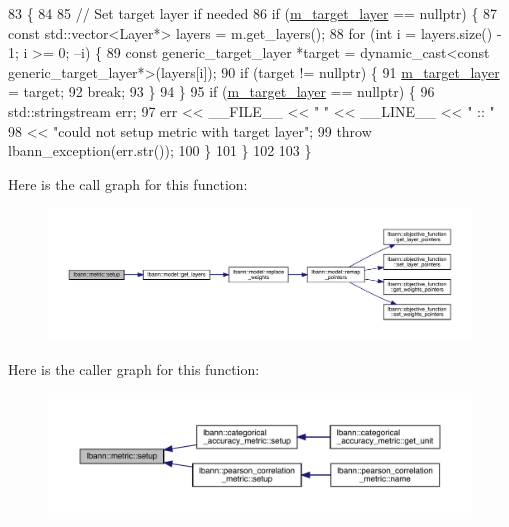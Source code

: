 \begin{DoxyCode}
83                            \{
84 
85   \textcolor{comment}{// Set target layer if needed}
86   \textcolor{keywordflow}{if} (\hyperlink{classlbann_1_1metric_a2bf6c53efb1b525bfa63a8c3167968d9}{m\_target\_layer} == \textcolor{keyword}{nullptr}) \{
87     \textcolor{keyword}{const} std::vector<Layer*> layers = m.get\_layers();
88     \textcolor{keywordflow}{for} (\textcolor{keywordtype}{int} i = layers.size() - 1; i >= 0; --i) \{
89       \textcolor{keyword}{const} generic\_target\_layer *target = \textcolor{keyword}{dynamic\_cast<}\textcolor{keyword}{const }generic\_target\_layer*\textcolor{keyword}{>}(layers[i]);
90       \textcolor{keywordflow}{if} (target != \textcolor{keyword}{nullptr}) \{
91         \hyperlink{classlbann_1_1metric_a2bf6c53efb1b525bfa63a8c3167968d9}{m\_target\_layer} = target;
92         \textcolor{keywordflow}{break};
93       \}
94     \}
95     \textcolor{keywordflow}{if} (\hyperlink{classlbann_1_1metric_a2bf6c53efb1b525bfa63a8c3167968d9}{m\_target\_layer} == \textcolor{keyword}{nullptr}) \{
96       std::stringstream err;
97       err << \_\_FILE\_\_ << \textcolor{stringliteral}{" "} << \_\_LINE\_\_ << \textcolor{stringliteral}{" :: "}
98           << \textcolor{stringliteral}{"could not setup metric with target layer"};
99       \textcolor{keywordflow}{throw} lbann\_exception(err.str());
100     \}
101   \}
102 
103 \}
\end{DoxyCode}
Here is the call graph for this function\+:\nopagebreak
\begin{figure}[H]
\begin{center}
\leavevmode
\includegraphics[width=350pt]{classlbann_1_1metric_a898d23e410297378db2fe9f8d1754fe0_cgraph}
\end{center}
\end{figure}
Here is the caller graph for this function\+:\nopagebreak
\begin{figure}[H]
\begin{center}
\leavevmode
\includegraphics[width=350pt]{classlbann_1_1metric_a898d23e410297378db2fe9f8d1754fe0_icgraph}
\end{center}
\end{figure}


